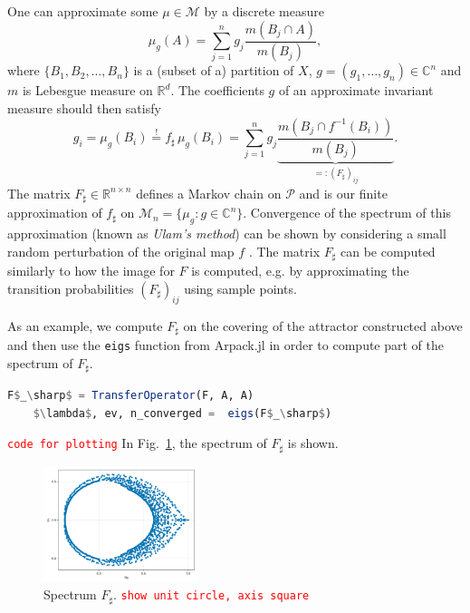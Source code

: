 \documentclass{juliacon}
\newcommand{\R}{{\mathbb R}}
\newcommand{\bbC}{{\mathbb C}}
\newcommand{\cP}{\mathcal{P}}
\newcommand{\cM}{\mathcal{M}}
\newcommand{\todo}[1]{\textcolor{red}{\texttt{#1}}}
\begin{document}
One can approximate some $\mu\in\cM$ by a discrete measure 
\begin{equation}
    \mu_g(A) = \sum_{j=1}^{n} g_j \frac{m(B_j \cap A)}{m(B_j)}, 
\end{equation}
where $\{ B_1, B_2, \ldots, B_n\}$ is a (subset of a) partition of $X$, $g=(g_1,\ldots,g_n)\in\bbC^n$ and $m$ is Lebesgue measure on $\R^d$. The coefficients $g$ of an approximate invariant measure should then satisfy
\begin{equation}
    g_i = \mu_g (B_i) \overset{!}{=} f_\sharp\, \mu_g (B_i) = 
    \sum_{j=1}^{n} g_j
    \underbrace{\frac{m(B_j \cap f^{-1} (B_i))}{m(B_j)}}_{
    =: \left( F_\sharp \right)_{ij}
    }. 
\end{equation}
The matrix $F_\sharp\in\R^{n\times n}$ defines a Markov chain on $\cP$ and is our finite approximation of $f_\sharp$ on $\cM_n=\{\mu_g:g\in\bbC^n\}$. Convergence of the spectrum of this approximation (known as \emph{Ulam's method}) can be shown by considering a small random perturbation of the original map $f$ \cite{DeJu:99}.  The matrix $F_\sharp$ can be computed similarly to how the image for $F$ is computed, e.g. by approximating the transition probabilities $(F_\sharp)_{ij}$ using sample points.


As an example, we compute $F_\sharp$ on the covering of the attractor constructed  above and then use the \texttt{eigs} function from Arpack.jl in order to compute part of the spectrum of $F_\sharp$. 
\begin{lstlisting}[language=Julia,mathescape,backgroundcolor=\color{white}]
    F$_\sharp$ = TransferOperator(F, A, A)
    $\lambda$, ev, n_converged =  eigs(F$_\sharp$)
\end{lstlisting}
\todo{code for plotting}
In Fig.~\ref{fig:spectrum}, the spectrum of $F_\sharp$ is shown. 
\begin{figure}[h]
    \centering
    \includegraphics[width=0.4\textwidth]{spectrum.pdf}
    \caption{Spectrum $F_\sharp$. \todo{show unit circle, axis square}}
    \label{fig:spectrum}
\end{figure}
\end{document}
